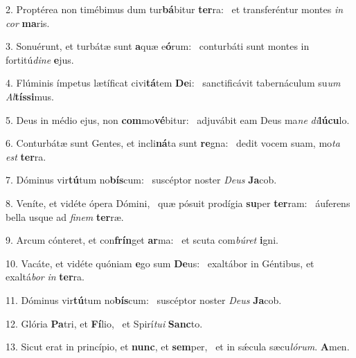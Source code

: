 2. Proptérea non timébimus dum tur\textbf{bá}bitur \textbf{ter}ra: \ast\  et transferéntur montes \textit{in} \textit{cor} \textbf{ma}ris.\

3. Sonuérunt, et turbátæ sunt \textbf{a}quæ e\textbf{ó}rum: \ast\  conturbáti sunt montes in fortitú\textit{di}\textit{ne} \textbf{e}jus.\

4. Flúminis ímpetus lætíficat civi\textbf{tá}tem \textbf{De}i: \ast\  sanctificávit tabernáculum su\textit{um} \textit{Al}\textbf{tís}\textbf{si}mus.\

5. Deus in médio ejus, non \textbf{com}mo\textbf{vé}bitur: \ast\  adjuvábit eam Deus ma\textit{ne} \textit{di}\textbf{lú}\textbf{cu}lo.\

6. Conturbátæ sunt Gentes, et incli\textbf{ná}ta sunt \textbf{re}gna: \ast\  dedit vocem suam, mo\textit{ta} \textit{est} \textbf{ter}ra.\

7. Dóminus vir\textbf{tú}tum no\textbf{bís}cum: \ast\  suscéptor noster \textit{De}\textit{us} \textbf{Ja}cob.\

8. Veníte, et vidéte ópera Dómini, \dag\  quæ pósuit prodígia \textbf{su}per \textbf{ter}ram: \ast\  áuferens bella usque ad \textit{fi}\textit{nem} \textbf{ter}ræ.\

9. Arcum cónteret, et con\textbf{frín}get \textbf{ar}ma: \ast\  et scuta com\textit{bú}\textit{ret} \textbf{i}gni.\

10. Vacáte, et vidéte quóniam \textbf{e}go sum \textbf{De}us: \ast\  exaltábor in Géntibus, et exaltá\textit{bor} \textit{in} \textbf{ter}ra.\

11. Dóminus vir\textbf{tú}tum no\textbf{bís}cum: \ast\  suscéptor noster \textit{De}\textit{us} \textbf{Ja}cob.\

12. Glória \textbf{Pa}tri, et \textbf{Fí}lio, \ast\  et Spirí\textit{tu}\textit{i} \textbf{Sanc}to.\

13. Sicut erat in princípio, et \textbf{nunc}, et \textbf{sem}per, \ast\  et in sǽcula sæcu\textit{ló}\textit{rum}. \textbf{A}men.\

